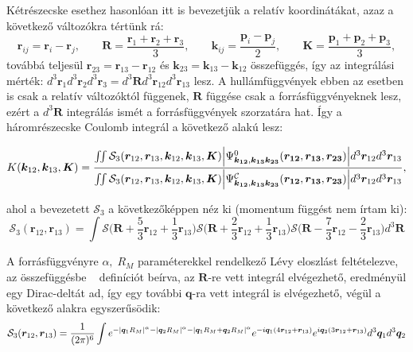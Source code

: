 \documentclass[11pt,a4paper]{article}
\numberwithin{equation}{subsection}
\numberwithin{figure}{section}
\begin{document}
Kétrészecske esethez hasonlóan itt is bevezetjük a relatív koordinátákat, azaz a következő változókra tértünk rá:
\begin{equation}
\bm{r}_{ij} = \bm{r}_i-\bm{r}_j,\;\;\;\;\;\;\;
\bm{R}=\frac{\bm{r}_1+\bm{r}_2+\bm{r}_3}{3},\;\;\;\;\;\;\;
\bm{k}_{ij}=\frac{\bm{p}_{i}-\bm{p}_{j}}{2},\;\;\;\;\;\;\;
\bm{K} = \frac{\bm{p}_1+\bm{p}_2+\bm{p}_3}{3},
\label{eq:CMF3}
\end{equation}
továbbá teljesül $\bm{r}_{23}=\bm{r}_{13}-\bm{r}_{12}$ és $\bm{k}_{23}=\bm{k}_{13}-\bm{k}_{12}$ összefüggés, így az integrálási mérték: $d^3 \bm{r}_1d^3 \bm{r}_2d^3 \bm{r}_3=d^3\bm{R} d^3\bm{r}_{12} d^3\bm{r}_{13}$ lesz. A hullámfüggvények ebben az esetben is csak a relatív változóktól függenek, $\bm{R}$ függése csak a forrásfüggvényeknek lesz, ezért a $d^3\bm{R}$ integrálás ismét a forrásfüggvények szorzatára hat. Így a háromrészecske Coulomb integrál a következő alakú lesz:

\begin{equation}
K(\bm{k}_{12},\bm{k}_{13},\bm{K})=
\frac{
\iint
\mathcal{S}_{3}(\bm{r}_{12}, \bm{r}_{13}, \bm{k}_{12}, \bm{k}_{13}, \bm{K})
\abs{\Psi^{0}_{\bm{k_{12}},\bm{k_{13}}\bm{k_{23}}}(\bm{r_{12}},\bm{r_{13}},\bm{r_{23}})} d^3 \bm{r}_{12}d^3 \bm{r}_{13}
}{\iint
\mathcal{S}_{3}(\bm{r}_{12}, \bm{r}_{13}, \bm{k}_{12}, \bm{k}_{13}, \bm{K})
\abs{\Psi^{\mathcal{C}}_{\bm{k_{12}},\bm{k_{13}}\bm{k_{23}}}(\bm{r_{12}},\bm{r_{13}},\bm{r_{23}})} d^3 \bm{r}_{12}d^3 \bm{r}_{13}},
\label{eq:K3}
\end{equation}

ahol a bevezetett $\mathcal{S}_3$ a következőképpen néz ki (momentum függést nem írtam ki):
\begin{equation}
\mathcal{S}_{3}(\bm{r}_{12}, \bm{r}_{13}) =
\int 
\mathcal{S}\bigg(\bm{R}+\frac{5}{3}\bm{r}_{12}+\frac{1}{3}\bm{r}_{13}\bigg)
\mathcal{S}\bigg(\bm{R}+\frac{2}{3}\bm{r}_{12}+\frac{1}{3}\bm{r}_{13}\bigg)
\mathcal{S}\bigg(\bm{R}-\frac{7}{3}\bm{r}_{12}-\frac{2}{3}\bm{r}_{13}\bigg)
d^3\bm{R}
\end{equation}

A forrásfüggvényre $\alpha,\;R_M$ paraméterekkel rendelkező Lévy eloszlást feltételezve, az összefüggésbe ~ definíciót beírva, az $\bm{R}$-re vett integrál elvégezhető, eredményül egy Dirac-deltát ad, így egy további $\bm{q}$-ra vett integrál is elvégezhető, végül a következő alakra egyszerűsödik: 
\begin{equation}
\mathcal{S}_3(\bm{r}_{12}, \bm{r}_{13}) = \frac{1}{(2\pi)^6}
\int
e^{-\abs{\bm{q}_1R_M}^\alpha-\abs{\bm{q}_2R_M}^\alpha-\abs{\bm{q}_1R_M+\bm{q}_2R_M}^\alpha}
e^{-i\bm{q}_1(4\bm{r}_{12}+\bm{r}_{13})}
e^{i\bm{q}_2(3\bm{r}_{12}+\bm{r}_{13})}
d^3\bm{q}_1d^3\bm{q}_2
\label{eq:S3}
\end{equation}
\end{document}
